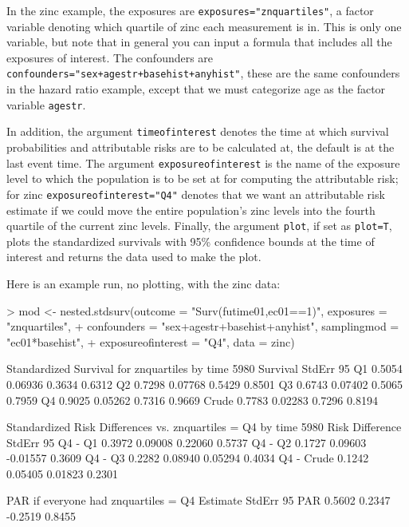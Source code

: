 \documentclass[10pt]{article}
\begin{document}
In the zinc example, the exposures are \texttt{exposures="znquartiles"}, a factor variable
denoting which quartile of zinc each measurement is in.  This is only one variable, but
note that in general you can input a formula that includes all the exposures of interest.
The confounders are \texttt{confounders="sex+agestr+basehist+anyhist"}, these are the same
confounders in the hazard ratio example, except that we must categorize age as the factor
variable \texttt{agestr}.

In addition, the argument \texttt{timeofinterest} denotes the time at which survival
probabilities and attributable risks are to be calculated at, the default is at the last
event time.  The argument \texttt{exposureofinterest} is the name of the exposure level to
which the population is to be set at for computing the attributable risk; for zinc
\texttt{exposureofinterest="Q4"} denotes that we want an attributable risk estimate if we
could move the entire population's zinc levels into the fourth quartile of the current
zinc levels.  Finally, the argument \texttt{plot}, if set as \texttt{plot=T}, plots the
standardized survivals with 95\% confidence bounds at the time of interest and returns the
data used to make the plot.

Here is an example run, no plotting, with the zinc data:
\begin{Schunk}
\begin{Sinput}
> mod <- nested.stdsurv(outcome = "Surv(futime01,ec01==1)", exposures = "znquartiles", 
+     confounders = "sex+agestr+basehist+anyhist", samplingmod = "ec01*basehist", 
+     exposureofinterest = "Q4", data = zinc)
\end{Sinput}
\begin{Soutput}
Standardized Survival for znquartiles by time 5980 
      Survival  StdErr 95%
Q1      0.5054 0.06936      0.3634       0.6312
Q2      0.7298 0.07768      0.5429       0.8501
Q3      0.6743 0.07402      0.5065       0.7959
Q4      0.9025 0.05262      0.7316       0.9669
Crude   0.7783 0.02283      0.7296       0.8194

Standardized Risk Differences vs. znquartiles = Q4 by time 5980 
           Risk Difference  StdErr 95%
Q4 - Q1             0.3972 0.09008     0.22060       0.5737
Q4 - Q2             0.1727 0.09603    -0.01557       0.3609
Q4 - Q3             0.2282 0.08940     0.05294       0.4034
Q4 - Crude          0.1242 0.05405     0.01823       0.2301

PAR if everyone had znquartiles = Q4 
    Estimate StdErr 95%
PAR   0.5602 0.2347         -0.2519           0.8455
\end{Soutput}
\end{Schunk}
\end{document}
